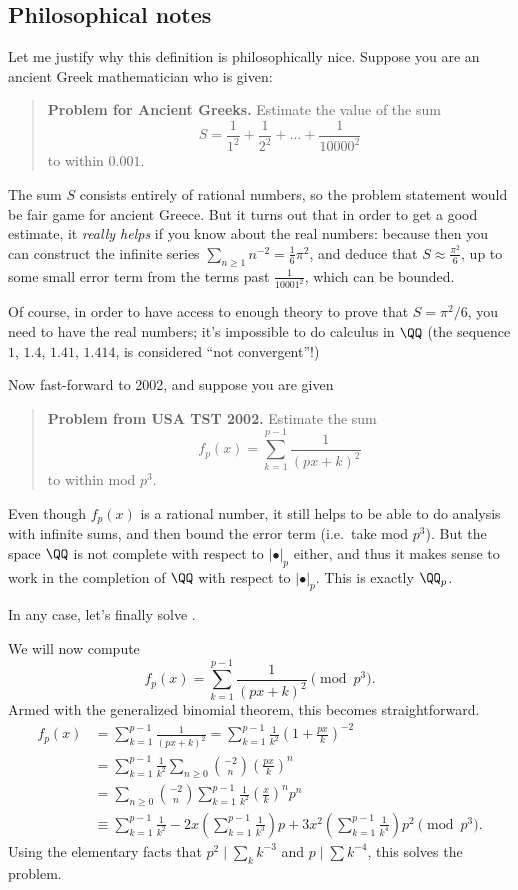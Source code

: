 \subsection{Philosophical notes}
Let me justify why this definition is philosophically nice.
Suppose you are an ancient Greek mathematician who is given:
\begin{quote}
	\textbf{Problem for Ancient Greeks.}
	Estimate the value of the sum
	\[ S = \frac{1}{1^2} + \frac{1}{2^2} + \dots + \frac{1}{10000^2} \]
	to within $0.001$.
\end{quote}
The sum $S$ consists entirely of rational numbers,
so the problem statement would be fair game for ancient Greece.
But it turns out that in order to get a good estimate,
it \emph{really helps} if you know about the real numbers:
because then you can construct the infinite series
$\sum_{n \ge 1} n^{-2} = \frac16 \pi^2$,
and deduce that $S \approx \frac{\pi^2}{6}$,
up to some small error term from the terms past $\frac{1}{10001^2}$,
which can be bounded.

Of course, in order to have access to enough theory
to prove that $S = \pi^2/6$, you need to have the real numbers;
it's impossible to do calculus in $\QQ$
(the sequence $1$, $1.4$, $1.41$, $1.414$,
is considered ``not convergent''!)

Now fast-forward to 2002, and suppose you are given
\begin{quote}
	\textbf{Problem from USA TST 2002.}
	Estimate the sum
	\[ f_p(x) = \sum_{k=1}^{p-1} \frac{1}{(px+k)^2} \]
	to within mod $p^3$.
\end{quote}
Even though $f_p(x)$ is a rational number,
it still helps to be able to do analysis with infinite sums,
and then bound the error term (i.e.\ take mod $p^3$).
But the space $\QQ$ is not complete with respect
to $\left\lvert \bullet \right\rvert_p$ either,
and thus it makes sense to work in the completion of $\QQ$
with respect to $\left\lvert \bullet \right\rvert_p$.
This is exactly $\QQ_p$.

In any case, let's finally solve .
\begin{example}
We will now compute
\[ f_p(x) = \sum_{k=1}^{p-1} \frac{1}{(px+k)^2} \pmod{p^3}. \]
Armed with the generalized binomial theorem,
this becomes straightforward.
\begin{align*}
	f_p(x) &= \sum_{k=1}^{p-1} \frac{1}{(px+k)^2}
	= \sum_{k=1}^{p-1} \frac{1}{k^2}
	\left( 1 + \frac{px}{k} \right)^{-2} \\
	&= \sum_{k=1}^{p-1} \frac{1}{k^2} \sum_{n \ge 0}
	\binom{-2}{n} \left( \frac{px}{k} \right)^{n} \\
	&= \sum_{n \ge 0} \binom{-2}{n}
	\sum_{k=1}^{p-1} \frac{1}{k^2} \left( \frac{x}{k} \right)^{n} p^n \\
	&\equiv \sum_{k=1}^{p-1} \frac{1}{k^2}
	 - 2x \left( \sum_{k=1}^{p-1} \frac{1}{k^3} \right) p
	 + 3x^2 \left( \sum_{k=1}^{p-1} \frac{1}{k^4} \right) p^2 \pmod{p^3}.
\end{align*}
Using the elementary facts that
$p^2 \mid \sum_k k^{-3}$ and $p \mid \sum k^{-4}$,
this solves the problem.
\end{example}


